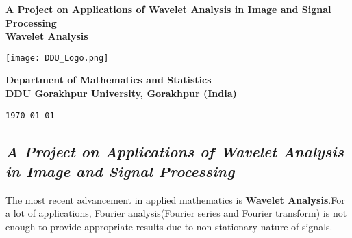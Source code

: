 \documentclass[12pt, a4paper]{article} %
\begin{document}
\begin{titlepage}
    \begin{center}
        \vspace*{1cm}

        \LARGE{\bf A Project on Applications of Wavelet Analysis in Image and Signal Processing}\\ 
        \Large{\textbf{Wavelet Analysis}}

        \vspace*{1cm}

        \texttt{[image: DDU\_Logo.png]}
        \vspace*{1cm}

        \begin{center}
            {\bf Department of Mathematics and Statistics\\
        DDU Gorakhpur University, Gorakhpur (India)}
        \end{center}
        
        \vfill %

        {\tt \today}\\
    \end{center}
\end{titlepage}

\BgThispage
\tableofcontents
\thispagestyle{empty}
\clearpage

\setcounter{page}{1}


\BgThispage
\begin{center}
    \section{\slshape A Project on Applications of Wavelet Analysis in Image and Signal Processing}
\end{center}

The most recent advancement in applied mathematics is {\bf Wavelet Analysis}.For a lot of applications, Fourier analysis(Fourier series and Fourier transform) is not enough to provide appropriate results due to non-stationary nature of signals.
\end{document}
